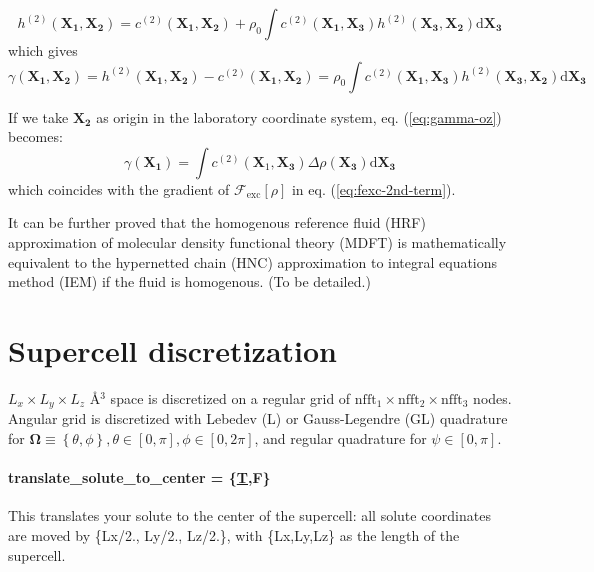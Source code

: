 \begin{equation}
h^{(2)}(\mathbf{X_{1}},\mathbf{X_{2}})=c^{(2)}(\mathbf{X_{1}},\mathbf{X_{2}})+\rho_{0}\int c^{(2)}(\mathbf{X_{1}},\mathbf{X_{3}})h^{(2)}(\mathbf{X_{3}},\mathbf{X_{2}})\mathrm{d}\mathbf{X_{3}}\label{eq:oz-iem-1}
\end{equation}
which gives 
\begin{equation}
\gamma(\mathbf{X_{1}},\mathbf{X_{2}})=h^{(2)}(\mathbf{X_{1}},\mathbf{X_{2}})-c^{(2)}(\mathbf{X_{1}},\mathbf{X_{2}})=\rho_{0}\int c^{(2)}(\mathbf{X_{1}},\mathbf{X_{3}})h^{(2)}(\mathbf{X_{3}},\mathbf{X_{2}})\mathrm{d}\mathbf{X_{3}}\label{eq:gamma-oz}
\end{equation}


If we take $\mathbf{X_{2}}$ as origin in the laboratory coordinate
system, eq. (\ref{eq:gamma-oz}) becomes:
\begin{equation}
\gamma(\mathbf{X_{1}})=\int c^{(2)}(\mathbf{X}_{1},\mathbf{X_{3}})\Delta\rho(\mathbf{X_{3}})\mathrm{d}\mathbf{X_{3}}\label{eq:gamma-oz-1}
\end{equation}
which coincides with the gradient of $\mathcal{F}_{\mathrm{exc}}\left[\rho\right]$
in eq. (\ref{eq:fexc-2nd-term}).

It can be further proved that the homogenous reference fluid (HRF)
approximation of molecular density functional theory (MDFT) is mathematically
equivalent to the hypernetted chain (HNC) approximation to integral
equations method (IEM) if the fluid is homogenous. (To be detailed.)


\section{Supercell discretization}

$L_{x}\times L_{y}\times L_{z}$ Å$^{3}$ space is discretized on
a regular grid of $\textrm{nfft}_{1}\times\textrm{nfft}_{2}\times\textrm{nfft}_{3}$
nodes. Angular grid is discretized with Lebedev (L) or Gauss-Legendre
(GL) quadrature for $\bm{\Omega}\equiv\left\{ \theta,\phi\right\} ,\theta\in\left[0,\pi\right],\phi\in\left[0,2\pi\right]$,
and regular quadrature for $\psi\in\left[0,\pi\right]$.


\paragraph{translate\_solute\_to\_center = \{\uline{T},F\}\protect \\
}

This translates your solute to the center of the supercell: all solute
coordinates are moved by \{Lx/2., Ly/2., Lz/2.\}, with \{Lx,Ly,Lz\}
as the length of the supercell.


